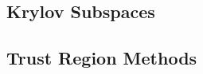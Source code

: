 







\subsection{Krylov Subspaces}

\label{ssec:krylov_subspaces}



\subsection{Trust Region Methods}